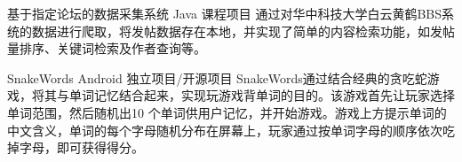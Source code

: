 \documentclass[11pt,a4paper,sans]{moderncv}   %
\begin{document}
\begin{CJK}{UTF8}{gbsn}
{基于指定论坛的数据采集系统}
{Java}
{课程项目}{}
{通过对华中科技大学白云黄鹤BBS系统的数据进行爬取，将发帖数据存在本地，并实现了简单的内容检索功能，如发帖量排序、关键词检索及作者查询等。}
\vspace*{0.2\baselineskip}

{SnakeWords}
{Android}
{独立项目/开源项目}{}
{SnakeWords通过结合经典的贪吃蛇游戏，将其与单词记忆结合起来，实现玩游戏背单词的目的。该游戏首先让玩家选择单词范围，然后随机出10 个单词供用户记忆，并开始游戏。游戏上方提示单词的中文含义，单词的每个字母随机分布在屏幕上，玩家通过按单词字母的顺序依次吃掉字母，即可获得得分。}
\vspace*{0.2\baselineskip}


\renewcommand{\baselinestretch}{1.0}

\closesection{}                   %
\renewcommand{\listitemsymbol}{-} %
\clearpage\end{CJK}
\end{document}
